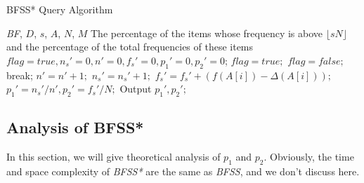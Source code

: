 \documentclass[conference]{IEEEtran}
\begin{document}
\begin{algorithm}[h]
	\caption{BFSS* Query Algorithm}
	\label{alg:bfss*}
	\begin{algorithmic}[1]
		\REQUIRE \emph{BF}, $D$, $s$, $A$, $N$, $M$
		\ENSURE The percentage of the items whose frequency is above $\lfloor s
		N\rfloor$ and the percentage of the total frequencies of these items
	    \STATE $flag=true,n_s'=0,n'=0,f_s'=0,p_1'=0,p_2'=0$;
    	\STATE $flag=true;$
	    \STATE $flag=false;$
	    \STATE break;
	    \ENDIF
	    \ENDFOR
	    \STATE $n'=n'+1;$
	    \STATE $n_s'=n_s'+1;$
	    \STATE $f_s'=f_s'+(f(A[i])-\Delta(A[i]));$
	    \ENDIF
	    \ENDIF
	    \ENDIF
	    \ENDFOR
	    \STATE $p_1'=n_s'/n',p_2'=f_s'/N;$
	    \STATE Output $p_1',p_2';$
	\end{algorithmic}
\end{algorithm}

\subsection{Analysis of BFSS*}
In this section, we will give theoretical analysis of $p_1$ and $p_2$. Obviously, the time and space complexity of \emph{BFSS*} are the same as \emph{BFSS}, and we don't discuss here.
\end{document}
